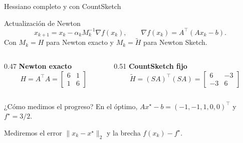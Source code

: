 \documentclass[aspectratio=169,11pt]{beamer}
\begin{document}
\begin{frame}{Hessiano completo y con CountSketch}

    \begin{block}{Actualización de Newton}
        \[
            x_{k+1}=x_k-\alpha_k M_k^{-1}\nabla f(x_k),
            \qquad
            \nabla f(x_k)=A^\top(Ax_k-b).
        \]
        {\small
        Con $M_k=H$ para Newton exacto y
        $M_k=\widetilde H$ para Newton Sketch.
        }
    \end{block}

    \vspace{0.2cm}

    \begin{columns}[T,onlytextwidth]
        \begin{column}{0.47\textwidth}
            \centering
            \textcolor{main}{\textbf{Newton exacto}}
            \[
                H=A^\top A=
                \begin{bmatrix}
                    6&1\\
                    1&6
                \end{bmatrix}
            \]

        \end{column}

        \begin{column}{0.51\textwidth}
            \centering
            \textcolor{main}{\textbf{CountSketch fijo}}
            \[
                \widetilde H=(SA)^\top(SA)
                =\begin{bmatrix}
                    6&-3\\
                    -3&6
                \end{bmatrix}
            \]

        \end{column}
    \end{columns}

    \vspace{0.2cm}
    \begin{block}{¿Cómo medimos el progreso?}
        En el óptimo, $Ax^\star-b=(-1,-1,1,0,0)^\top$
        y $f^\star=3/2$.

        Mediremos el error $\|x_k-x^\star\|_2$
        y la brecha $f(x_k)-f^\star$.
    \end{block}



\end{frame}
\end{document}
